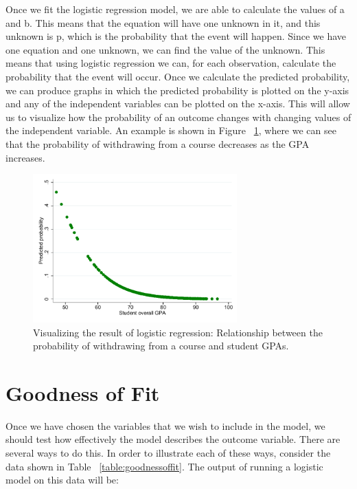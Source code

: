 \documentclass[a4paper,12pt,oneside]{book}
\begin{document}
Once we fit the logistic regression model, we are able to calculate the values of a and b. This means that the equation will have one unknown in it, and this unknown is p, which is the probability that the event 
will happen. Since we have one equation and one unknown, we can find the value of the unknown. This means that using logistic regression we can, for each observation, calculate the probability that the event will occur. 
Once we calculate the predicted probability, we can produce graphs in which the predicted probability is plotted on the y-axis and any of the independent variables can be plotted on the x-axis. 
This will allow us to visualize how the probability of an outcome changes with changing values of the independent variable. An example is shown in Figure ~\ref{fig:prediction}, where we can see that the probability of withdrawing from 
a course decreases as the GPA increases.

\begin{stlog}\end{stlog}
\begin{figure}[h]
    \centering
    \includegraphics[width=0.7\textwidth]{book_4.pdf}
    \caption{Visualizing the result of logistic regression: Relationship between the probability of withdrawing from a course and student GPAs.}
    \label{fig:prediction}
\end{figure}
\section{Goodness of Fit}
Once we have chosen the variables that we wish to include in the model, we should test how effectively the model describes the outcome variable. There are several ways to do this. In order to illustrate each 
of these ways, consider the data shown in Table ~\ref{table:goodnessoffit}. The output of running a logistic model on this data will be:
\end{document}
